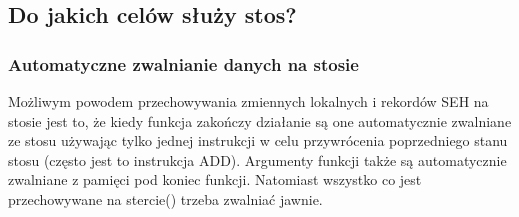 \subsection{Do jakich celów służy stos?}



\EN{}
\RU{}
\PTBR{}
\PL{}




\subsubsection{Automatyczne zwalnianie danych na stosie}
Możliwym powodem przechowywania zmiennych lokalnych i rekordów SEH na stosie jest to, że kiedy funkcja zakończy działanie są one automatycznie zwalniane ze stosu używając tylko jednej instrukcji w celu przywrócenia poprzedniego stanu stosu (często jest to instrukcja ADD). Argumenty funkcji także są automatycznie zwalniane z pamięci pod koniec funkcji. Natomiast wszystko co jest przechowywane na stercie() trzeba zwalniać jawnie.

\EN{}
\RU{}
\PTBR{}
\PL{}




